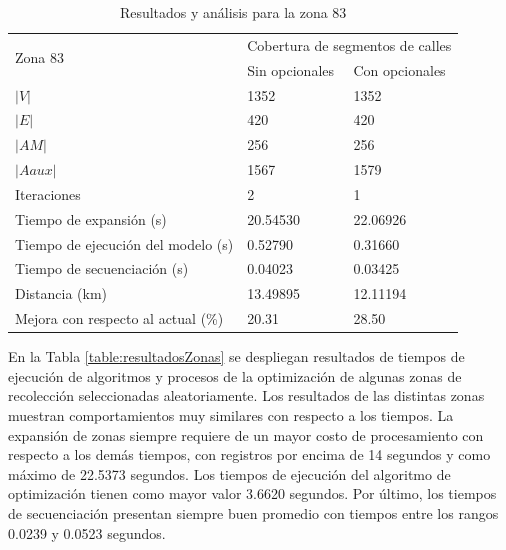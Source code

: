 \begin{table}[htbp]
\caption{Resultados y análisis para la zona 83}
\begin{tabular}{lll}
\hline
\multirow{2}{*}{Zona 83}                            & \multicolumn{2}{l}{Cobertura de segmentos de calles} \\ \cline{2-3} 
                                                    & Sin opcionales           & Con opcionales           \\ \hline
$|V|$                                                   & 1352                     & 1352                     \\
$|E|$                                                   & 420                      & 420                      \\
$|AM|$                                                  & 256                      & 256                      \\
$|Aaux|$                                                & 1567                     & 1579                     \\
Iteraciones                                         & 2                        & 1                        \\
Tiempo de expansión (s)                      & 20.54530                 & 22.06926                 \\ 
Tiempo de ejecución del modelo (s)            & 0.52790                  & 0.31660                  \\ 
Tiempo de secuenciación (s)                  & 0.04023                  & 0.03425                  \\ 
Distancia (km)                                      & 13.49895                 & 12.11194                 \\ 
Mejora con respecto al actual (\%) & 20.31                    & 28.50                    \\ \hline
\end{tabular}
\label{table:comparacionZona83}
\end{table}

En la Tabla \ref{table:resultadosZonas} se despliegan resultados de tiempos de ejecución de algoritmos y procesos de la optimización de algunas zonas de recolección seleccionadas aleatoriamente. Los resultados de las distintas zonas muestran comportamientos muy similares con respecto a los tiempos. La expansión de zonas siempre requiere de un mayor costo de procesamiento con respecto a los demás tiempos, con registros por encima de 14 segundos y como máximo de 22.5373 segundos. Los tiempos de ejecución del algoritmo de optimización tienen como mayor valor 3.6620 segundos. Por último, los tiempos de secuenciación presentan siempre buen promedio con tiempos entre los rangos 0.0239 y 0.0523 segundos.

